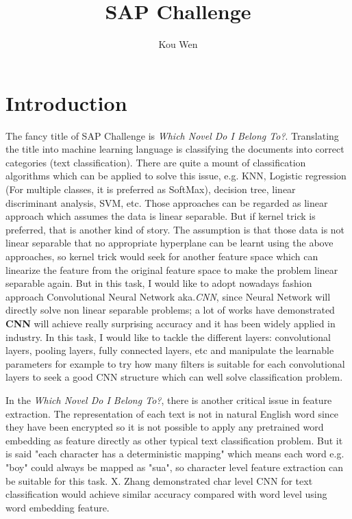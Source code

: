 \documentclass[a4paper]{article}
\title{SAP Challenge}
\author{Kou Wen}
\begin{document}
\maketitle

\section{Introduction}

The fancy title of SAP Challenge is \emph{Which Novel Do I Belong To?}. Translating the title into machine learning language is classifying the documents into correct categories (text classification). There are quite a mount of classification algorithms which can be applied to solve this issue, e.g. KNN, Logistic regression (For multiple classes, it is preferred as SoftMax), decision tree, linear discriminant analysis, SVM, etc. Those approaches can be regarded as linear approach which assumes the data is linear separable. But if kernel trick is preferred, that is another kind of story. The assumption is that those data is not linear separable that no appropriate hyperplane can be learnt using the above approaches, so kernel trick would seek for another feature space which can linearize the feature from the original feature space to make the problem linear separable again. But in this task, I would like to adopt nowadays fashion approach Convolutional Neural Network aka.\emph{CNN}, since Neural Network will directly solve non linear separable problems; a lot of works have demonstrated \textbf{CNN} will achieve really surprising accuracy and it has been widely applied in industry. In this task, I would like to tackle the different layers: convolutional layers, pooling layers, fully connected layers, etc and manipulate the learnable parameters for example to try how many filters is suitable for each convolutional layers to seek a good CNN structure which can well solve classification problem.

In the \emph{Which Novel Do I Belong To?}, there is another critical issue in feature extraction. The representation of each text is not in natural English word since they have been encrypted so it is not possible to apply any pretrained word embedding as feature directly as other typical text classification problem. But it is said "each character has a deterministic mapping" which means each word e.g. "boy" could always be mapped as "sua", so character level feature extraction can be suitable for this task. X. Zhang \cite{ZhangZL15} demonstrated char level CNN for text classification would achieve similar accuracy compared with word level using word embedding feature.
\end{document}
